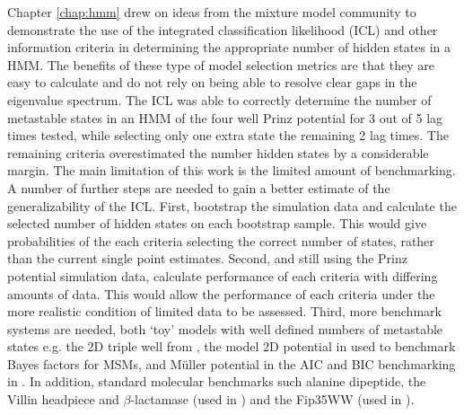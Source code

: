 Chapter \ref{chap:hmm} drew on ideas from the mixture model community to demonstrate the use of the integrated classification likelihood (ICL) and other information criteria in determining  the appropriate number of hidden states in a HMM.  The benefits of these type of model selection metrics are that they are easy to calculate and do not rely on being able to resolve clear gaps in the eigenvalue spectrum. The ICL was able to correctly determine the number of metastable states in an HMM of the four well Prinz potential for \num{3} out of \num{5} lag times tested, while selecting only one extra state the remaining \num{2} lag times. The remaining criteria overestimated the number  hidden states by a considerable margin. The main limitation of this work is the limited amount of  benchmarking. A number of further steps are needed to gain a better estimate of the generalizability of the ICL. First, bootstrap the simulation data and calculate the selected number of hidden states on each bootstrap sample. This would give probabilities of the each criteria selecting the correct number of states, rather than the current single point estimates. Second, and still using the Prinz potential simulation data, calculate performance of each criteria with differing amounts of data. This would allow the performance of each criteria under the more realistic condition of limited data to be assessed. Third, more benchmark systems are needed, both `toy' models with well defined numbers of metastable states e.g. the 2D triple well from \cite{noeProjectedHiddenMarkov2013a}, the model 2D potential in \cite{bacalladoBayesianComparisonMarkov2009a} used to benchmark Bayes factors for MSMs, and M{\"u}ller potential in the AIC and BIC benchmarking in \cite{mcgibbonStatisticalModelSelection2014a}. In addition, standard molecular benchmarks such alanine dipeptide, the Villin headpiece and $\beta$-lactamase (used in \cite{bowmanQuantitativeComparisonAlternative2013}) and the Fip35WW (used in \cite{mcgibbonStatisticalModelSelection2014a}).  

